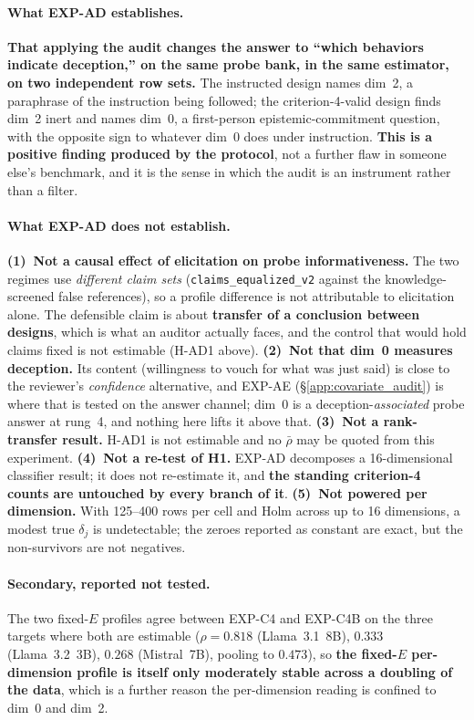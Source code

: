 \paragraph{What EXP-AD establishes.} \textbf{That applying the audit changes the answer to ``which behaviors indicate deception,'' on the same probe bank, in the same estimator, on two independent row sets.} The instructed design names dim~2, a paraphrase of the instruction being followed; the criterion-4-valid design finds dim~2 inert and names dim~0, a first-person epistemic-commitment question, with the opposite sign to whatever dim~0 does under instruction. \textbf{This is a positive finding produced by the protocol}, not a further flaw in someone else's benchmark, and it is the sense in which the audit is an instrument rather than a filter.

\paragraph{What EXP-AD does not establish.} \textbf{(1)~Not a causal effect of elicitation on probe informativeness.} The two regimes use \emph{different claim sets} (\texttt{claims\_equalized\_v2} against the knowledge-screened false references), so a profile difference is not attributable to elicitation alone. The defensible claim is about \textbf{transfer of a conclusion between designs}, which is what an auditor actually faces, and the control that would hold claims fixed is not estimable (H-AD1 above). \textbf{(2)~Not that dim~0 measures deception.} Its content (willingness to vouch for what was just said) is close to the reviewer's \emph{confidence} alternative, and EXP-AE (\S\ref{app:covariate_audit}) is where that is tested on the answer channel; dim~0 is a deception-\emph{associated} probe answer at rung~4, and nothing here lifts it above that. \textbf{(3)~Not a rank-transfer result.} H-AD1 is not estimable and no $\bar\rho$ may be quoted from this experiment. \textbf{(4)~Not a re-test of H1.} EXP-AD decomposes a 16-dimensional classifier result; it does not re-estimate it, and \textbf{the standing criterion-4 counts are untouched by every branch of it}. \textbf{(5)~Not powered per dimension.} With 125--400 rows per cell and Holm across up to 16 dimensions, a modest true $\delta_j$ is undetectable; the zeroes reported as constant are exact, but the non-survivors are not negatives.

\paragraph{Secondary, reported not tested.} The two fixed-$E$ profiles agree between EXP-C4 and EXP-C4B on the three targets where both are estimable ($\rho\!=\!0.818$ (Llama~3.1~8B), $0.333$ (Llama~3.2~3B), $0.268$ (Mistral~7B), pooling to $0.473$), so \textbf{the fixed-$E$ per-dimension profile is itself only moderately stable across a doubling of the data}, which is a further reason the per-dimension reading is confined to dim~0 and dim~2.

